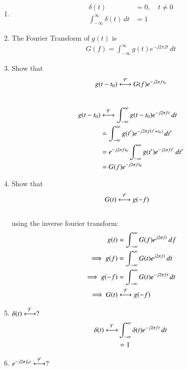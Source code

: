 \documentclass[journal,12pt,twocolumn]{IEEEtran}
\renewcommand\thesection{\arabic{section}}
\begin{document}
\begin{enumerate}[label=\thesection.\arabic*
,ref=\thesection.\theenumi]
\item 
	\begin{align}
		\delta(t)&=0, \quad t\neq0
\\
		\int_{-\infty}^{\infty}\delta(t) \, dt&= 1
	\end{align}
 \item The Fourier Transform of $g(t)$ is
 \begin{align}
 G(f)=\int_{-\infty}^{\infty}g(t)e^{-j2\pi ft}\,dt
 \end{align}
 \item Show that 
 \begin{align}
	 g(t-t_0)&\overset{\mathcal{F}}{ \longleftrightarrow}G(f)e^{-j2\pi ft_0}\\
 \end{align}\\\solution\begin{align}
     g(t-t_0)&\overset{\mathcal{F}}{ \longleftrightarrow}\int_{-\infty}^{\infty}g(t-t_0)e^{-j2\pi ft}\,dt\\
     &= \int_{-\infty}^{\infty}g(t')e^{-j2\pi f\left(t'+t_0\right)}\,dt'\\
     &= e^{-j2\pi ft_0}\int_{-\infty}^{\infty}g(t')e^{-j2\pi ft'}\,dt'\\
     &= G(f)e^{-j2\pi ft_0}
 \end{align}
 \item Show that 
 \begin{align}
	 G(t)&\overset{\mathcal{F}}{ \longleftrightarrow}g(-f)
 \end{align}\\\solution
 using the inverse fourier transform:
 \begin{align}
    g(t)&=\int_{-\infty}^{\infty}G(f)e^{j2\pi ft}\,df\\
    \implies g(f)&=\int_{-\infty}^{\infty}G(t)e^{j2\pi ft}\,dt\\
     \implies g(-f)&=\int_{-\infty}^{\infty}G(t)e^{-j2\pi ft}\,dt\\
     \implies G(t)&\overset{\mathcal{F}}{ \longleftrightarrow}g(-f)
 \end{align}
 \item $\delta(t)\overset{\mathcal{F}}{ \longleftrightarrow}?$\\\solution
 \begin{align}
     \delta(t)\overset{\mathcal{F}}{ \longleftrightarrow}&\int _{-\infty}^{\infty} \delta(t)e^{-j2\pi ft}\,dt\\
     &= 1
 \end{align}
 \item $e^{-j2\pi f_0t}\overset{\mathcal{F}}{ \longleftrightarrow}?$\\\solution

\end{enumerate}
\end{document}
